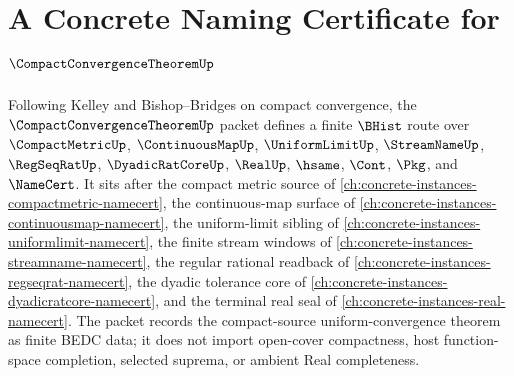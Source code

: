 \chapter{A Concrete Naming Certificate for $\CompactConvergenceTheoremUp$}
\label{ch:concrete-instances-compact-convergence-theorem-namecert}

Following Kelley and Bishop--Bridges on compact convergence, the $\CompactConvergenceTheoremUp$ packet defines a finite $\BHist$ route over $\CompactMetricUp$, $\ContinuousMapUp$, $\UniformLimitUp$, $\StreamNameUp$, $\RegSeqRatUp$, $\DyadicRatCoreUp$, $\RealUp$, $\hsame$, $\Cont$, $\Pkg$, and $\NameCert$. It sits after the compact metric source of \autoref{ch:concrete-instances-compactmetric-namecert}, the continuous-map surface of \autoref{ch:concrete-instances-continuousmap-namecert}, the uniform-limit sibling of \autoref{ch:concrete-instances-uniformlimit-namecert}, the finite stream windows of \autoref{ch:concrete-instances-streamname-namecert}, the regular rational readback of \autoref{ch:concrete-instances-regseqrat-namecert}, the dyadic tolerance core of \autoref{ch:concrete-instances-dyadicratcore-namecert}, and the terminal real seal of \autoref{ch:concrete-instances-real-namecert}. The packet records the compact-source uniform-convergence theorem as finite BEDC data; it does not import open-cover compactness, host function-space completion, selected suprema, or ambient Real completeness.

